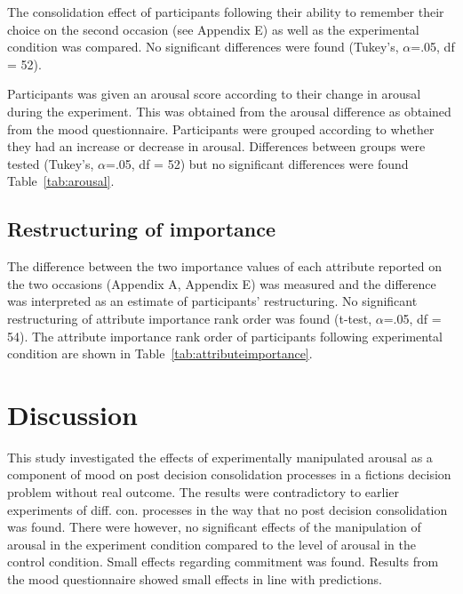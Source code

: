 \documentclass[jou,draftfirst,11pt]{apa6}
\newcommand{\tabell}[1]{Table~\ref{#1}}
\begin{document}
The consolidation effect of participants following their ability to
remember their choice on the second occasion (see Appendix E) as well
as the experimental condition was compared.   No significant
differences were found (Tukey's, $\alpha$=.05, df = 52).

Participants was given an arousal score according to their change in
arousal during the experiment. This was obtained from the arousal
difference as obtained from the mood questionnaire.  Participants were
grouped according to whether they had an increase or decrease in
arousal.  Differences between groups were tested (Tukey's, $\alpha$=.05, df =
52) but no significant differences were found \tabell{tab:arousal}.


\subsection{Restructuring of importance}

The difference between the two importance values of each attribute
reported on the two occasions (Appendix A, Appendix E) was measured
and the difference was interpreted as an estimate of participants'
restructuring. No significant restructuring  of attribute importance
rank order was found (t-test, $\alpha$=.05, df = 54).  The attribute
importance rank order of participants following experimental condition
are shown in \tabell{tab:attributeimportance}.


\section{Discussion}

This study investigated the effects of experimentally manipulated
arousal as a component of mood on post decision consolidation
processes in a fictions decision problem without real outcome. The
results were contradictory to earlier experiments of
diff. con. processes in the way that  no post decision consolidation
was found.  There were however, no significant effects of the
manipulation of arousal in the experiment condition compared to the
level of arousal in the control condition.  Small effects regarding
commitment was found.   Results from the mood questionnaire showed
small effects in line with predictions.
\end{document}
